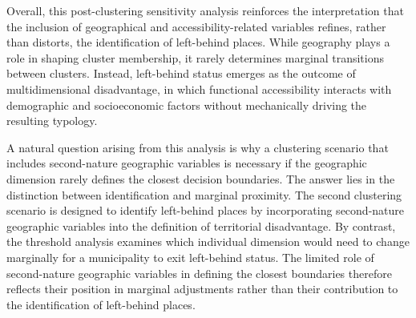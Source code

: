 \documentclass[a4paper,11pt,oneside]{article}
\begin{document}

Overall, this post-clustering sensitivity analysis reinforces the interpretation that the inclusion of geographical and accessibility-related variables refines, rather than distorts, the identification of left-behind places. While geography plays a role in shaping cluster membership, it rarely determines marginal transitions between clusters. Instead, left-behind status emerges as the outcome of multidimensional disadvantage, in which functional accessibility interacts with demographic and socioeconomic factors without mechanically driving the resulting typology.

A natural question arising from this analysis is why a clustering scenario that includes second-nature geographic variables is necessary if the geographic dimension rarely defines the closest decision boundaries. The answer lies in the distinction between identification and marginal proximity. The second clustering scenario is designed to identify left-behind places by incorporating second-nature geographic variables into the definition of territorial disadvantage. By contrast, the threshold analysis examines which individual dimension would need to change marginally for a municipality to exit left-behind status. The limited role of second-nature geographic variables in defining the closest boundaries therefore reflects their position in marginal adjustments rather than their contribution to the identification of left-behind places.
\end{document}
